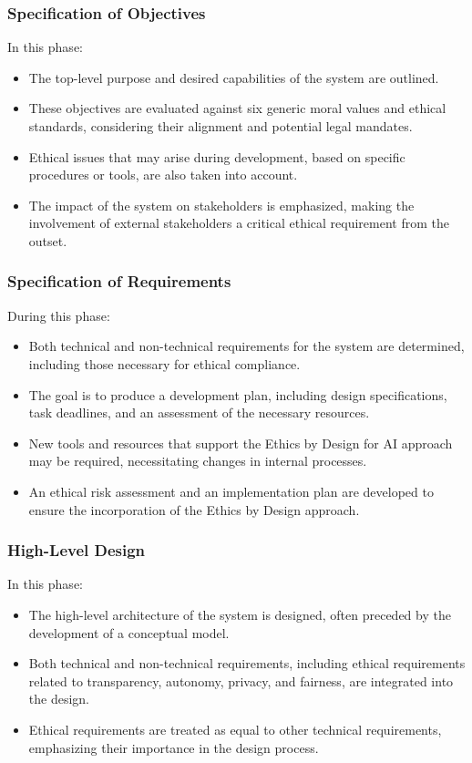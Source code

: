 \documentclass{article}
\begin{document}
\subsubsection{Specification of Objectives}
In this phase:
\begin{itemize}
    \item The top-level purpose and desired capabilities of the system are outlined.
    \item These objectives are evaluated against six generic moral values and ethical standards, considering their alignment and potential legal mandates.
    \item Ethical issues that may arise during development, based on specific procedures or tools, are also taken into account.
    \item The impact of the system on stakeholders is emphasized, making the involvement of external stakeholders a critical ethical requirement from the outset.
\end{itemize}

\subsubsection{Specification of Requirements}
During this phase:
\begin{itemize}
    \item Both technical and non-technical requirements for the system are determined, including those necessary for ethical compliance.
    \item The goal is to produce a development plan, including design specifications, task deadlines, and an assessment of the necessary resources.
    \item New tools and resources that support the Ethics by Design for AI approach may be required, necessitating changes in internal processes.
    \item An ethical risk assessment and an implementation plan are developed to ensure the incorporation of the Ethics by Design approach.
\end{itemize}

\subsubsection{High-Level Design}
In this phase:
\begin{itemize}
    \item The high-level architecture of the system is designed, often preceded by the development of a conceptual model.
    \item Both technical and non-technical requirements, including ethical requirements related to transparency, autonomy, privacy, and fairness, are integrated into the design.
    \item Ethical requirements are treated as equal to other technical requirements, emphasizing their importance in the design process.
\end{itemize}
\end{document}
